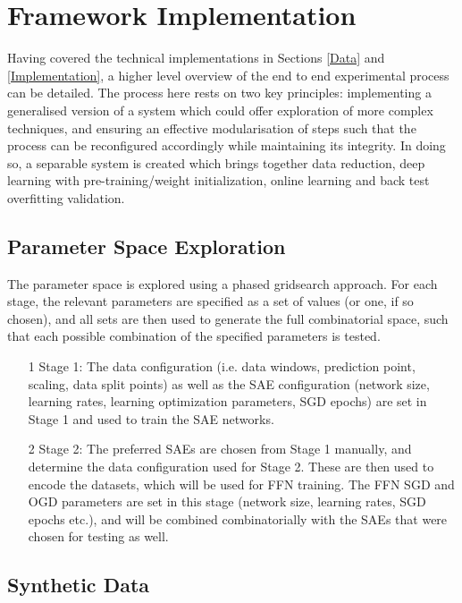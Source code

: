 \documentclass[a4paper,11pt,oneside]{article}
\theoremstyle{plain}
\theoremstyle{definition}
\begin{document}
		
		
	\newpage
	\section{Framework Implementation}\label{imp_proc}
	
	Having covered the technical implementations in Sections \ref{Data} and \ref{Implementation}, a higher level overview of the end to end experimental process can be detailed. The process here rests on two key principles: implementing a generalised version of a system which could offer exploration of more complex techniques, and ensuring an effective modularisation of steps such that the process can be reconfigured accordingly while maintaining its integrity. In doing so, a separable system is created which brings together data reduction, deep learning with pre-training/weight initialization, online learning and back test overfitting validation.
	
	\subsection{Parameter Space Exploration}\label{proc_parameters}
	
	The parameter space is explored using a phased gridsearch approach. For each stage, the relevant parameters are specified as a set of values (or one, if so chosen), and all sets are then used to generate the full combinatorial space, such that each possible combination of the specified parameters is tested.
	
	\begin{itemize}
		\item[1] Stage 1: The data configuration (i.e. data windows, prediction point, scaling, data split points) as well as the SAE configuration (network size, learning rates, learning optimization parameters, SGD epochs) are set in Stage 1 and used to train the SAE networks.
		\item[2] Stage 2: The preferred SAEs are chosen from Stage 1 manually, and determine the data configuration used for Stage 2. These are then used to encode the datasets, which will be used for FFN training. The FFN SGD and OGD parameters are set in this stage (network size, learning rates, SGD epochs etc.), and will be combined combinatorially with the SAEs that were chosen for testing as well.
	\end{itemize}
	
	\subsection{Synthetic Data}\label{proc_synthetic}
	
\end{document}
